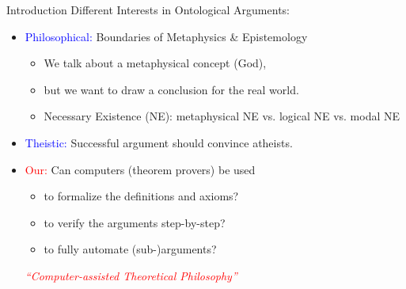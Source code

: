 \begin{frame}{Introduction} \Large
Different Interests in Ontological Arguments: \\[1em]
\begin{itemize}
\item \textcolor{blue}{Philosophical:} Boundaries of Metaphysics \& Epistemology
  \begin{itemize}
  \item We talk about a metaphysical concept (God), 
  \item but we want to draw
      a conclusion for the real world. \\[1em]
  \item Necessary Existence (NE): metaphysical NE vs. logical NE  vs. modal NE \\[2em]
  \end{itemize} 
\item \textcolor{blue}{Theistic:} Successful argument should convince atheists. \\[2em]
\item \textcolor{red}{Our:} Can computers (theorem provers) be used
  \begin{itemize}
  \item to formalize the definitions and axioms?
  \item to verify the arguments step-by-step?
  \item to fully automate (sub-)arguments? \\[1em]
  \end{itemize}
  \textcolor{red}{\emph{``Computer-assisted Theoretical Philosophy''}}
\end{itemize}
\end{frame}

